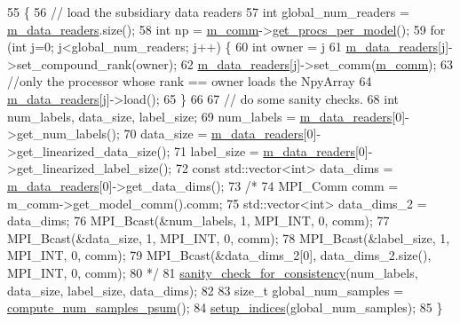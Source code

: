 \begin{DoxyCode}
55                                                       \{
56   \textcolor{comment}{// load the subsidiary data readers}
57   \textcolor{keywordtype}{int} global\_num\_readers = \hyperlink{classlbann_1_1generic__compound__data__reader_a9815e94ade5873415fd766e09d956d5b}{m\_data\_readers}.size();
58   \textcolor{keywordtype}{int} np = \hyperlink{classlbann_1_1generic__data__reader_ad3976d4b7db2d404dbb87a56c33fd456}{m\_comm}->\hyperlink{classlbann_1_1lbann__comm_a5755dfdfc6377b4cae5ef8f7819e17de}{get\_procs\_per\_model}();
59   \textcolor{keywordflow}{for} (\textcolor{keywordtype}{int} j=0; j<global\_num\_readers; j++) \{
60     \textcolor{keywordtype}{int} owner = j %
61     \hyperlink{classlbann_1_1generic__compound__data__reader_a9815e94ade5873415fd766e09d956d5b}{m\_data\_readers}[j]->set\_compound\_rank(owner);
62     \hyperlink{classlbann_1_1generic__compound__data__reader_a9815e94ade5873415fd766e09d956d5b}{m\_data\_readers}[j]->set\_comm(\hyperlink{classlbann_1_1generic__data__reader_ad3976d4b7db2d404dbb87a56c33fd456}{m\_comm});
63     \textcolor{comment}{//only the processor whose rank == owner loads the NpyArray}
64     \hyperlink{classlbann_1_1generic__compound__data__reader_a9815e94ade5873415fd766e09d956d5b}{m\_data\_readers}[j]->load(); 
65   \}
66 
67   \textcolor{comment}{// do some sanity checks.}
68   \textcolor{keywordtype}{int} num\_labels, data\_size, label\_size;
69   num\_labels = \hyperlink{classlbann_1_1generic__compound__data__reader_a9815e94ade5873415fd766e09d956d5b}{m\_data\_readers}[0]->get\_num\_labels();
70   data\_size = \hyperlink{classlbann_1_1generic__compound__data__reader_a9815e94ade5873415fd766e09d956d5b}{m\_data\_readers}[0]->get\_linearized\_data\_size();
71   label\_size = \hyperlink{classlbann_1_1generic__compound__data__reader_a9815e94ade5873415fd766e09d956d5b}{m\_data\_readers}[0]->get\_linearized\_label\_size();
72   \textcolor{keyword}{const} std::vector<int> data\_dims = \hyperlink{classlbann_1_1generic__compound__data__reader_a9815e94ade5873415fd766e09d956d5b}{m\_data\_readers}[0]->get\_data\_dims();
73   \textcolor{comment}{/*}
74 \textcolor{comment}{  MPI\_Comm comm = m\_comm->get\_model\_comm().comm;}
75 \textcolor{comment}{  std::vector<int> data\_dims\_2 = data\_dims;}
76 \textcolor{comment}{  MPI\_Bcast(&num\_labels, 1, MPI\_INT, 0, comm);}
77 \textcolor{comment}{  MPI\_Bcast(&data\_size, 1, MPI\_INT, 0, comm);}
78 \textcolor{comment}{  MPI\_Bcast(&label\_size, 1, MPI\_INT, 0, comm);}
79 \textcolor{comment}{  MPI\_Bcast(&data\_dims\_2[0], data\_dims\_2.size(), MPI\_INT, 0, comm);}
80 \textcolor{comment}{  */}
81   \hyperlink{classlbann_1_1data__reader__merge__samples_a240368aa9f7f2ab1fa7c8d534b7f54ed}{sanity\_check\_for\_consistency}(num\_labels, data\_size, label\_size, data\_dims);
82 
83   \textcolor{keywordtype}{size\_t} global\_num\_samples = \hyperlink{classlbann_1_1data__reader__merge__samples_aafa54258bdc9d888da61c817462cdf65}{compute\_num\_samples\_psum}();
84   \hyperlink{classlbann_1_1data__reader__merge__samples_ae5fe8d5cf8eb1a6aa715579d329a620e}{setup\_indices}(global\_num\_samples);
85 \}
\end{DoxyCode}
